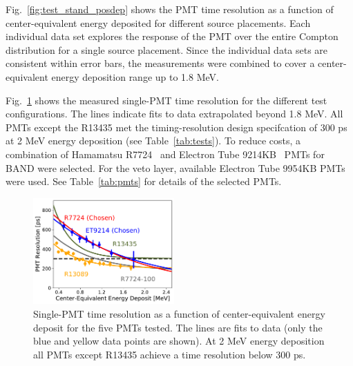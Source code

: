 \documentclass[3p,final,twocolumn]{elsarticle}
\begin{document}
Fig.~\ref{fig:test_stand_posdep} shows the PMT time resolution as a
function of center-equivalent energy deposited for different source placements. Each individual data set explores the response of the PMT over the entire Compton distribution for a single source placement. Since the individual data sets are consistent within error bars,
the measurements were combined to cover a center-equivalent energy deposition range
up to 1.8 \si{\mega\electronvolt}.



Fig.~\ref{fig:test_stand_results} shows the measured single-PMT time
resolution for the different test configurations.  The lines indicate fits
to data extrapolated beyond 1.8 \si{\mega\electronvolt}.  
All PMTs except the R13435 met the timing-resolution design specifcation of 300 \si{\pico\s} at 2
\si{\mega\electronvolt} energy deposition (see 
Table~\ref{tab:tests}).  To reduce costs, a combination of
Hamamatsu R7724~\cite{pmtR7724} and Electron Tube 9214KB~\cite{pmt9214} PMTs for BAND were selected. For the veto layer,  
available Electron Tube 9954KB PMTs were used. See Table~\ref{tab:pmts} for
details of the selected PMTs.

\begin{figure}[tb]
	\centering
		\includegraphics[width=0.48\textwidth]{all-lines-somedata.pdf}
		\caption{Single-PMT time resolution as a function of center-equivalent energy deposit for the five PMTs
                  tested. The lines are fits to data (only the blue  and yellow data points are shown). At 2
                  \si{\mega\electronvolt} energy deposition all PMTs except R13435 achieve a time resolution below 300 \si{\pico\s}.}
          	\label{fig:test_stand_results}
\end{figure}
\end{document}
